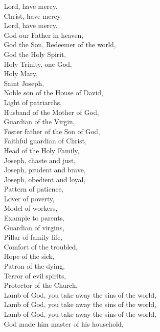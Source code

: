 Lord, have mercy. \\
Christ, have mercy. \\
Lord, have mercy. \\
God our Father in heaven, \\
God the Son, Redeemer of the world, \\
God the Holy Spirit, \\
Holy Trinity, one God, \\
Holy Mary, \\
Saint Joseph, \\
Noble son of the House of David, \\
Light of patriarchs, \\
Husband of the Mother of God, \\
Guardian of the Virgin, \\
Foster father of the Son of God, \\
Faithful guardian of Christ, \\
Head of the Holy Family, \\
Joseph, chaste and just, \\
Joseph, prudent and brave, \\
Joseph, obedient and loyal, \\
Pattern of patience, \\
Lover of poverty, \\
Model of workers, \\
Example to parents, \\
Guardian of virgins, \\
Pillar of family life, \\
Comfort of the troubled, \\
Hope of the sick, \\
Patron of the dying, \\
Terror of evil spirits, \\
Protector of the Church, \\
Lamb of God, you take away the sins of the world, \\
Lamb of God, you take away the sins of the world, \\
Lamb of God, you take away the sins of the world, \\
God made him master of his household, 

